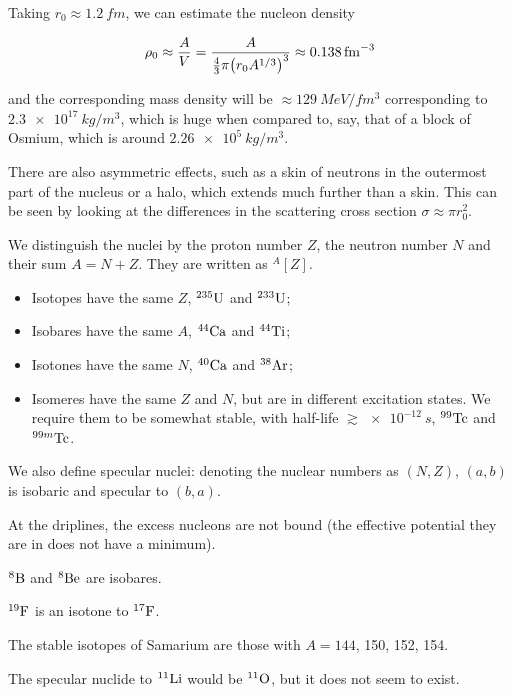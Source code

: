 \documentclass{article}
\begin{document}
\begin{bluebox}
  Taking \(r_0 \approx \SI{1.2}{fm} \), we can estimate the nucleon density

  \begin{equation}
      \rho_0 \approx \frac{A}{V} = \frac{A}{\frac{4}{3} \pi \qty(r_0 A^{1/3})^3} \approx \SI{0.138}{fm^{-3}}
  \end{equation}

  and the corresponding mass density will be \(\approx \SI{129}{MeV \per fm^3}\) corresponding to \( \SI{2.3e17}{kg \per m^3}\), which is huge when compared to, say, that of a block of Osmium, which is around \(\SI{2.26e5}{kg \per m^3}\).
\end{bluebox}

There are also asymmetric effects, such as a skin of neutrons in the outermost part of the nucleus or a halo, which extends much further than a skin. This can be seen by looking at the differences in the scattering cross section \(\sigma \approx \pi r_0^2\).

We distinguish the nuclei by the proton number \(Z\), the neutron number \(N\) and their sum \(A = N+Z\). They are written as \(^{A} [Z]\).

\begin{itemize}
    \item Isotopes have the same \(Z\), \(^{235} \ce{U} \) and \(^{233} \ce{U}  \);
    \item Isobares have the same \(A\), \(^{44} \ce{Ca} \) and \(^{44} \ce{Ti} \);
    \item Isotones have the same \(N\), \(^{40} \ce{Ca} \) and \(^{38} \ce{Ar} \);
    \item Isomeres have the same \(Z\) and \(N\), but are in different excitation states. We require them to be somewhat stable, with half-life \({\gtrsim \SI{e-12}{s}}\), \(^{99}\ce{Tc}  \) and \(^{99m}\ce{Tc}  \).
\end{itemize}

We also define specular nuclei: denoting the nuclear numbers as \((N,Z)\), \((a, b)\) is isobaric and specular to \((b, a)\).

\begin{bluebox}
  At the driplines, the excess nucleons are not bound (the effective potential they are in does not have a minimum).

  \(^{8} \ce{B} \) and \(^{8} \ce{Be} \) are isobares.

  \(^{19} \ce{F} \) is an isotone to \(^{17} \ce{F} \).

  The stable isotopes of Samarium are those with \(A=144\), 150, 152, 154.

  The specular nuclide to \(^{11} \ce{Li} \) would be \(^{11} \ce{O} \), but it does not seem to exist.
\end{bluebox}
\end{document}
